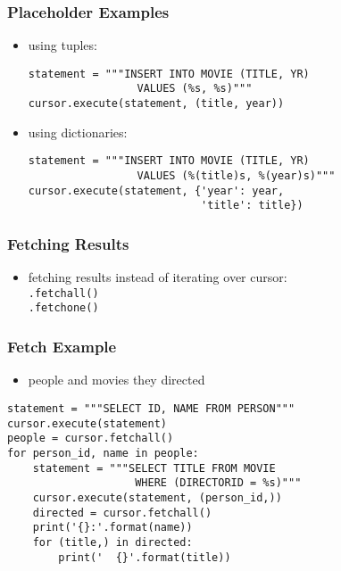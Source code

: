 \documentclass[dvipsnames]{beamer}
\theoremstyle{plain}
\begin{document}
\begin{frame}[fragile]
  \frametitle{Placeholder Examples}

  \begin{itemize}
    \item using tuples:
    \begin{lstlisting}
statement = """INSERT INTO MOVIE (TITLE, YR)
                 VALUES (%s, %s)"""
cursor.execute(statement, (title, year))
    \end{lstlisting}

    \pause
    \item using dictionaries:
    \begin{lstlisting}
statement = """INSERT INTO MOVIE (TITLE, YR)
                 VALUES (%(title)s, %(year)s)"""
cursor.execute(statement, {'year': year,
                           'title': title})
    \end{lstlisting}
  \end{itemize}
\end{frame}

\begin{frame}[fragile]
  \frametitle{Fetching Results}

  \begin{itemize}
    \item fetching results instead of iterating over cursor:\\
      \lstinline!.fetchall()!\\
      \lstinline!.fetchone()!
  \end{itemize}
\end{frame}

\begin{frame}[fragile]
  \frametitle{Fetch Example}

  \begin{itemize}
    \item people and movies they directed
  \end{itemize}

  \begin{lstlisting}
statement = """SELECT ID, NAME FROM PERSON"""
cursor.execute(statement)
people = cursor.fetchall()
for person_id, name in people:
    statement = """SELECT TITLE FROM MOVIE
                    WHERE (DIRECTORID = %s)"""
    cursor.execute(statement, (person_id,))
    directed = cursor.fetchall()
    print('{}:'.format(name))
    for (title,) in directed:
        print('  {}'.format(title))
  \end{lstlisting}
\end{frame}
\end{document}

